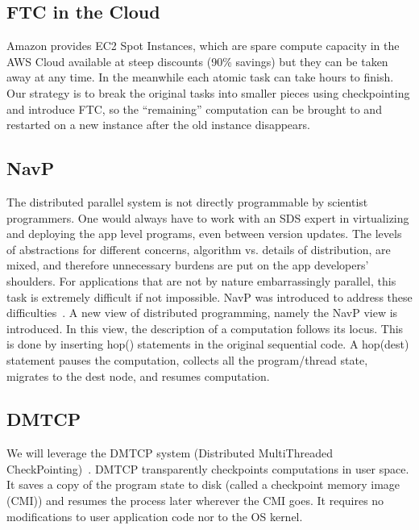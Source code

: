 \documentclass[conference]{IEEEtran}
\begin{document}
\subsection{FTC in the Cloud}
\label{subsec:s11}

Amazon provides EC2 Spot Instances, which are spare compute capacity in the AWS Cloud available at steep discounts (90\% savings) but they can be taken away at any time. In the meanwhile each atomic task can take hours to finish. Our strategy is to break the original tasks into smaller pieces using checkpointing and introduce FTC, so the ``remaining'' computation can be brought to and restarted on a new instance after the old instance disappears.

\subsection{NavP}
\label{subsec:s12}

The distributed parallel system is not directly programmable by scientist programmers. One would always have to work with an SDS expert in virtualizing and deploying the app level programs, even between version updates. The levels of abstractions for different concerns, algorithm vs. details of distribution, are mixed, and therefore unnecessary burdens are put on the app developers’ shoulders. For applications that are not by nature embarrassingly parallel, this task is extremely difficult if not impossible. NavP was introduced to address these difficulties~\cite{pan2004navp}. A new view of distributed programming, namely the NavP view is introduced. In this view, the description of a computation follows its locus. This is done by inserting  hop() statements in the original sequential code. A hop(dest) statement pauses the computation, collects all the program/thread state, migrates to the dest node, and resumes computation.

\subsection{DMTCP}
\label{subsec:s13}

We will leverage the DMTCP system (Distributed MultiThreaded CheckPointing)~\cite{ansel2009dmtcp}. DMTCP transparently checkpoints computations in user space. It saves a copy of the program state to disk (called a checkpoint memory image (CMI)) and resumes the process later wherever the CMI goes. It requires no modifications to user application code nor to the OS kernel.
\end{document}
